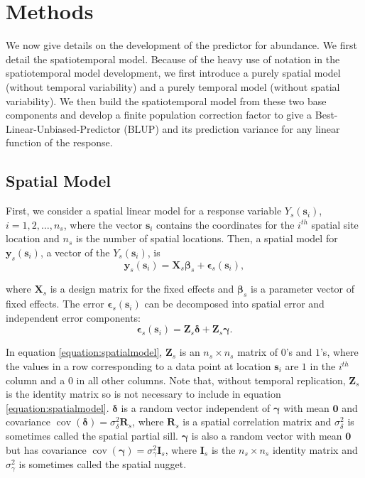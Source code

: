\documentclass[]{interact}
\theoremstyle{plain}%
\theoremstyle{definition}
\theoremstyle{remark}
\begin{document}
\section{Methods} \label{section:Methods}

We now give details on the development of the predictor for abundance.
We first detail the spatiotemporal model. Because of the heavy use of
notation in the spatiotemporal model development, we first introduce a
purely spatial model (without temporal variability) and a purely
temporal model (without spatial variability). We then build the
spatiotemporal model from these two base components and develop a finite
population correction factor to give a Best-Linear-Unbiased-Predictor
(BLUP) and its prediction variance for any linear function of the
response.

\subsection{Spatial Model} \label{subsection:spatialmodel}

First, we consider a spatial linear model for a response variable
\(Y_s(\mathbf{s}_{i})\), \(i = 1, 2, \ldots, n_{s}\), where the vector
\(\mathbf{s}_i\) contains the coordinates for the \(i^{th}\) spatial
site location and \(n_s\) is the number of spatial locations. Then, a
spatial model for \(\mathbf{y}_s(\mathbf{s}_{i})\), a vector of the
\(Y_s(\mathbf{s}_{i})\), is \mbox{} \begin{equation}
\mathbf{y}_s(\mathbf{s}_{i}) = \mathbf{X}_s \bm{\beta}_s + \bm{\epsilon}_s(\mathbf{s}_{i}),
\end{equation}

\noindent where \(\mathbf{X}_s\) is a design matrix for the fixed
effects and \(\bm{\beta}_s\) is a parameter vector of fixed effects. The
error \(\bm{\epsilon}_s(\mathbf{s}_{i})\) can be decomposed into spatial
error and independent error components: \mbox{} \begin{equation}
\label{equation:spatialmodel}
\bm{\epsilon}_s(\mathbf{s}_{i}) = \mathbf{Z}_{s} \bm{\delta} + \mathbf{Z}_{s} \bm{\gamma}.
\end{equation}

\noindent In equation \ref{equation:spatialmodel}, \(\mathbf{Z}_{s}\) is
an \(n_s \times n_s\) matrix of \(0\)'s and \(1\)'s, where the values in
a row corresponding to a data point at location \(\mathbf{s}_{i}\) are
\(1\) in the \(i^{th}\) column and a \(0\) in all other columns. Note
that, without temporal replication, \(\mathbf{Z}_s\) is the identity
matrix so is not necessary to include in equation
\ref{equation:spatialmodel}. \(\bm{\delta}\) is a random vector
independent of \(\bm{\gamma}\) with mean \(\mathbf{0}\) and covariance
\(\mathop{\mathrm{{cov}}}(\bm{\delta}) = \sigma^2_{\delta} \mathbf{R}_{s}\),
where \(\mathbf{R}_s\) is a spatial correlation matrix and
\(\sigma^2_{\delta}\) is sometimes called the spatial partial sill.
\(\bm{\gamma}\) is also a random vector with mean \(\mathbf{0}\) but has
covariance
\(\mathop{\mathrm{{cov}}}(\bm{\gamma}) = \sigma^2_{\gamma} \mathbf{I}_{s}\),
where \(\mathbf{I}_s\) is the \(n_s \times n_s\) identity matrix and
\(\sigma^2_{\gamma}\) is sometimes called the spatial nugget.
\end{document}
